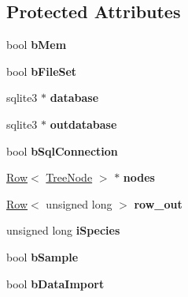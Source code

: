 \subsection*{Protected Attributes}
\begin{DoxyCompactItemize}
\item 
bool {\bfseries b\+Mem}\hypertarget{class_community_ad5344789223153c3756dbad28948410b}{}\label{class_community_ad5344789223153c3756dbad28948410b}

\item 
bool {\bfseries b\+File\+Set}\hypertarget{class_community_a82d7b635a6d81a0036238d02c5833e6d}{}\label{class_community_a82d7b635a6d81a0036238d02c5833e6d}

\item 
sqlite3 $\ast$ {\bfseries database}\hypertarget{class_community_a382c0e6e90ca8055d3192bfe2af4d741}{}\label{class_community_a382c0e6e90ca8055d3192bfe2af4d741}

\item 
sqlite3 $\ast$ {\bfseries outdatabase}\hypertarget{class_community_a884634e98e0aacb082968664acd5a32e}{}\label{class_community_a884634e98e0aacb082968664acd5a32e}

\item 
bool {\bfseries b\+Sql\+Connection}\hypertarget{class_community_aa9fe335ff9e94c626d1e0d41ff145524}{}\label{class_community_aa9fe335ff9e94c626d1e0d41ff145524}

\item 
\hyperlink{class_row}{Row}$<$ \hyperlink{class_tree_node}{Tree\+Node} $>$ $\ast$ {\bfseries nodes}\hypertarget{class_community_aa1309616989642b98c15e6e2ed25b379}{}\label{class_community_aa1309616989642b98c15e6e2ed25b379}

\item 
\hyperlink{class_row}{Row}$<$ unsigned long $>$ {\bfseries row\+\_\+out}\hypertarget{class_community_a06e5a133792f29fa17a1b0664d650541}{}\label{class_community_a06e5a133792f29fa17a1b0664d650541}

\item 
unsigned long {\bfseries i\+Species}\hypertarget{class_community_a094f10ce5bbbcab19bccda352f545aad}{}\label{class_community_a094f10ce5bbbcab19bccda352f545aad}

\item 
bool {\bfseries b\+Sample}\hypertarget{class_community_a40b8a468ecba59b2cb2c04750208495f}{}\label{class_community_a40b8a468ecba59b2cb2c04750208495f}

\item 
bool {\bfseries b\+Data\+Import}\hypertarget{class_community_ab6496c803e44395f4490f6301fc15a13}{}\label{class_community_ab6496c803e44395f4490f6301fc15a13}


\end{DoxyCompactItemize}
